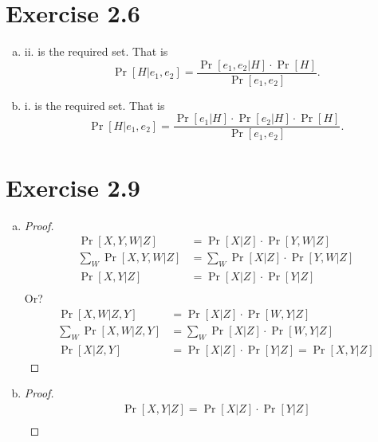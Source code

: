 \documentclass[12pt]{article}
\newcommand{\bayes}[2]{\frac{\Pr[#2|#1] \cdot \Pr[#1]}{\Pr[#2]}}
\begin{document}
\section*{Exercise 2.6}
\begin{enumerate}[a)]
    \item ii. is the required set. That is \[\Pr[H|e_1, e_2] = \bayes{H}{e_1, e_2}.\]
    \item i. is the required set. That is
        \[\Pr[H|e_1, e_2] = \frac{\Pr[e_1|H] \cdot \Pr[e_2|H] \cdot \Pr[H]}{\Pr[e_1, e_2]}.\]
\end{enumerate}
\section*{Exercise 2.9}
\begin{enumerate}[a)]
    \item 
        \begin{proof}
        \begin{align*}
            \Pr[X,Y,W|Z] &= \Pr[X|Z] \cdot \Pr[Y,W|Z]\\
            \sum_W \Pr[X,Y,W|Z] &= \sum_W \Pr[X|Z] \cdot \Pr[Y,W|Z]\\
            \Pr[X,Y|Z] &= \Pr[X|Z] \cdot \Pr[Y|Z]\\
        \end{align*}
        Or?
        \begin{align*}
            \Pr[X,W|Z,Y] &= \Pr[X|Z] \cdot \Pr[W,Y|Z]\\
            \sum_W \Pr[X,W|Z,Y] &= \sum_W \Pr[X|Z] \cdot \Pr[W,Y|Z]\\
            \Pr[X|Z,Y] &= \Pr[X|Z] \cdot \Pr[Y|Z] = \Pr[X,Y|Z]
        \end{align*}
        \end{proof}
    \item
        \begin{proof}
            \begin{align*}
            \Pr[X,Y|Z] = \Pr[X|Z] \cdot \Pr[Y|Z]\\
            \end{align*}
        \end{proof}

\end{enumerate}
\end{document}

